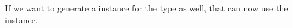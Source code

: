 If we want to generate a \GraphPredicate{} instance for the  type as well, that can now use the \GraphPredicatetree{} instance.




